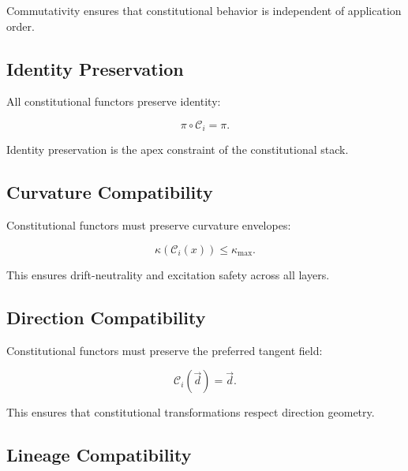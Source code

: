 Commutativity ensures that constitutional behavior is independent of
application order.


\subsection{Identity Preservation}

All constitutional functors preserve identity:

\[
\pi \circ \mathcal{C}_i = \pi.
\]

Identity preservation is the apex constraint of the constitutional stack.


\subsection{Curvature Compatibility}

Constitutional functors must preserve curvature envelopes:

\[
\kappa(\mathcal{C}_i(x)) \le \kappa_{\max}.
\]

This ensures drift-neutrality and excitation safety across all layers.


\subsection{Direction Compatibility}

Constitutional functors must preserve the preferred tangent field:

\[
\mathcal{C}_i(\vec{d}) = \vec{d}.
\]

This ensures that constitutional transformations respect direction geometry.


\subsection{Lineage Compatibility}

